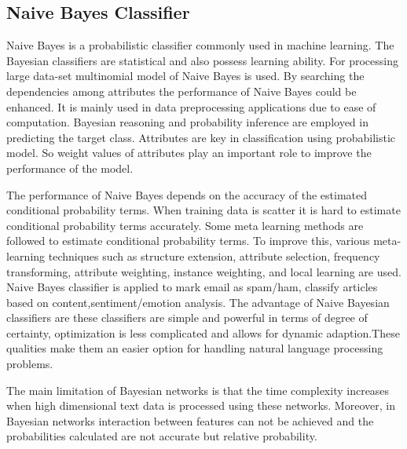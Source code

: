 \documentclass[12pt,a4paper]{report}
\begin{document}
\subsection{Naive Bayes Classifier}

Naive Bayes is a probabilistic classifier commonly used in machine learning. The Bayesian classifiers are statistical and also possess learning ability. For processing large data-set multinomial model of Naive Bayes is used. By searching the dependencies among attributes the performance of Naive Bayes could be enhanced. It is mainly used in data preprocessing applications due to ease of computation. Bayesian reasoning and probability inference are employed in predicting the target class. Attributes are key in classification using probabilistic model. So weight values of attributes play an important role to improve the performance of the model. %
\par
\vspace{0.5cm}
The performance of Naive Bayes depends on the accuracy of the estimated conditional probability terms. When training data is scatter it is hard to estimate conditional probability terms accurately. Some meta learning methods are followed to estimate conditional probability terms. To improve this, various meta-learning techniques such as structure extension, attribute selection, frequency transforming, attribute weighting, instance weighting, and local learning are used. Naive Bayes classifier is applied to mark email as spam/ham, classify articles based on content,sentiment/emotion analysis.%
The advantage of Naive Bayesian classifiers are these classifiers are simple and  powerful in terms of degree of certainty, optimization is less complicated and allows for dynamic adaption.These qualities  make them an easier option for handling natural language processing problems. \par
\vspace{.5cm}
The main limitation of Bayesian networks is that the time complexity increases when high dimensional text data is processed using these networks. Moreover, in Bayesian networks interaction between features can not be achieved and the probabilities calculated are not accurate but relative probability.
\end{document}
